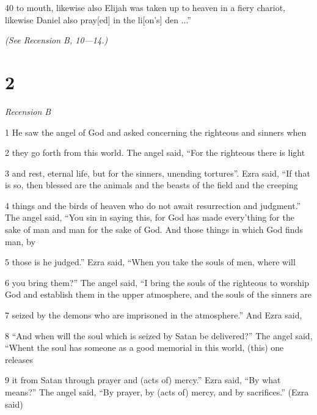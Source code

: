 \par 40 to mouth, likewise also Elijah was taken up to heaven in a fiery chariot, likewise
Daniel also pray[ed] in the li[on's] den ...”

\par \textit{(See Recension B, 10—14.)}

\chapter{2}

\par \textit{Recension B}

\par 1 He saw the angel of God and asked concerning the righteous and sinners when

\par 2 they go forth from this world. The angel said, “For the righteous there is light

\par 3 and rest, eternal life, but for the sinners, unending tortures”. Ezra said, “If that is so, then blessed are the animals and the beasts of the field and the creeping

\par 4 things and the birds of heaven who do not await resurrection and judgment.” The angel said, “You sin in saying this, for God has made every'thing for the sake of man and man for the sake of God. And those things in which God finds man, by

\par 5 those is he judged.” Ezra said, “When you take the souls of men, where will

\par 6 you bring them?” The angel said, “I bring the souls of the righteous to worship God and establish them in the upper atmosphere, and the souls of the sinners are

\par 7 seized by the demons who are imprisoned in the atmosphere.” And Ezra said,

\par 8 “And when will the soul which is seized by Satan be delivered?” The angel said, “Whent the soul has someone as a good memorial in this world, (this) one releases

\par 9 it from Satan through prayer and (acts of) mercy.” Ezra said, “By what means?” The angel said, “By prayer, by (acts of) mercy, and by sacrifices.” (Ezra said)

